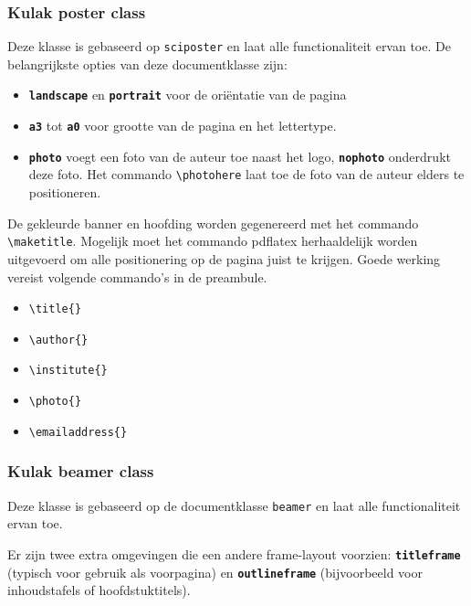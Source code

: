 \documentclass[kulak]{kulakarticle} %
\begin{document}
\subsubsection{Kulak poster class}

Deze klasse is gebaseerd op \texttt{sciposter} en laat alle functionaliteit ervan toe. De belangrijkste opties van deze documentklasse zijn:

\begin{itemize}
	\item \textbf{\texttt{landscape}} en \textbf{\texttt{portrait}} voor de oriëntatie van de pagina
	\item \textbf{\texttt{a3}} tot \textbf{\texttt{a0}} voor grootte van de pagina en het lettertype.
	\item \textbf{\texttt{photo}} voegt een foto van de auteur toe naast het logo, \textbf{\texttt{nophoto}} onderdrukt deze foto. Het commando \verb+\photohere+ laat toe de foto van de auteur elders te positioneren.
\end{itemize}

De gekleurde banner en hoofding worden gegenereerd met het commando \verb+\maketitle+. Mogelijk moet het commando pdflatex herhaaldelijk worden uitgevoerd om alle positionering op de pagina juist te krijgen. Goede werking vereist volgende commando's in de preambule.

\begin{itemize}
	\item \verb+\title{}+
	\item \verb+\author{}+
	\item \verb+\institute{}+
	\item \verb+\photo{}+
	\item \verb+\emailaddress{}+
\end{itemize}

\subsubsection{Kulak beamer class}

Deze klasse is gebaseerd op de documentklasse \texttt{beamer} en laat alle functionaliteit ervan toe.

Er zijn twee extra omgevingen die een andere frame-layout voorzien: \textbf{\texttt{titleframe}} (typisch voor gebruik als voorpagina) en \textbf{\texttt{outlineframe}} (bijvoorbeeld voor inhoudstafels of hoofdstuktitels).
\end{document}
